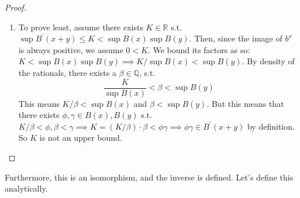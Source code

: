 \begin{proof}
\begin{enumerate}
    \item To prove least, assume there exists $K \in \mathbb{R}$ s.t. $\sup{B^\prime(x + y)} \leq K < \sup{B(x)} \sup{B(y)}$. Then, since the image of $b^x$ is always positive, we assume $0 < K$. We bound its factors as so: $K < \sup{B(x)} \sup{B(y)} \implies K/\sup{B(x)} < \sup{B(y)}$. By density of the rationals, there exists a $\beta \in \mathbb{Q}$, s.t. 
    \begin{equation}
      \frac{K}{\sup{B(x)}} < \beta < \sup{B(y)}
    \end{equation}
    This means $K/\beta < \sup{B(x)}$ and $\beta < \sup{B(y)}$. But this means that there exists $\phi, \gamma \in B(x), B(y)$ s.t. $K/\beta < \phi, \beta < \gamma \implies K = (K/\beta) \cdot \beta < \phi \gamma \implies \phi \gamma \in B^\prime(x + y)$ by definition. So $K$ is not an upper bound. 
    \end{enumerate}
  \end{proof}

  Furthermore, this is an isomorphism, and the inverse is defined. Let's define this analytically. 

